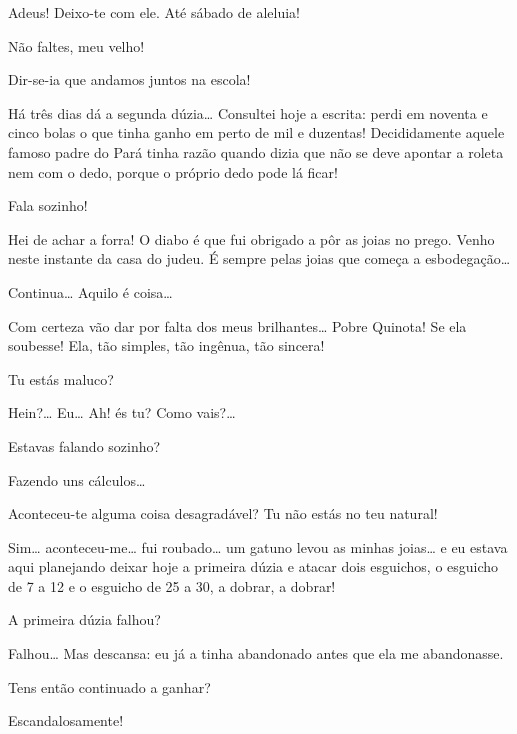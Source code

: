  Adeus! Deixo-te com ele. Até sábado de aleluia!

 Não faltes, meu velho! 

  Dir-se-ia que andamos juntos na escola! 


  Há três dias dá a segunda
dúzia\ldots{} Consultei hoje a escrita: perdi em noventa e cinco bolas o que tinha ganho
em perto de mil e duzentas! Decididamente aquele famoso padre do Pará tinha razão
quando dizia que não se deve apontar a roleta nem com o dedo, porque o próprio
dedo pode lá ficar!

  Fala sozinho!

 Hei de achar a forra! O diabo é que fui obrigado a pôr as joias
no prego. Venho neste instante da casa do judeu. É sempre pelas joias que começa a
esbodegação\ldots{}

  Continua\ldots{} Aquilo é coisa\ldots{}

 Com certeza vão dar por falta dos meus brilhantes\ldots{} Pobre
Quinota! Se ela soubesse! Ela, tão simples, tão ingênua, tão sincera!

  Tu estás maluco?

 Hein?\ldots{} Eu\ldots{} Ah! és tu? Como vais?\ldots{}

 Estavas falando sozinho?

 Fazendo uns cálculos\ldots{}

 Aconteceu-te alguma coisa desagradável? Tu não estás no teu natural!

 Sim\ldots{} aconteceu-me\ldots{} fui roubado\ldots{} um gatuno levou as minhas
joias\ldots{} e eu estava aqui planejando deixar hoje a primeira dúzia e atacar dois
esguichos, o esguicho de 7 a 12 e o esguicho de 25 a 30, a dobrar, a dobrar!

  A primeira dúzia falhou?

 Falhou\ldots{}  Mas descansa: eu já a tinha
abandonado antes que ela me abandonasse.

 Tens então continuado a ganhar?

 Escandalosamente!


